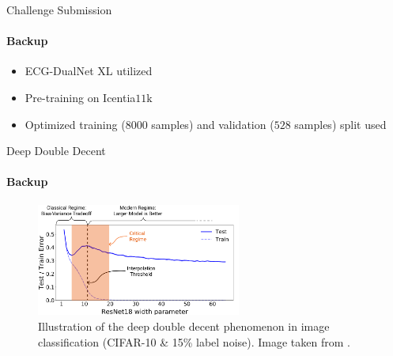 \begin{frame}{Challenge Submission}
\framesubtitle{Backup}
    \begin{itemize}
        \item ECG-DualNet XL utilized
        \item Pre-training on Icentia$11\si{\kilo}$
        \item Optimized training ($8000$ samples) and validation ($528$ samples) split used
    \end{itemize}
    \begin{table}[!ht]
        \centering
        \caption{Classification results of ECG-DualNet XL pre-trained on the Icentia$11$k dataset and fine-tuned on the PhysioNet dataset with optimized submission split. Metric computed on the small validation set.}
        
        \label{tab:results_challenge}
    \end{table}
\end{frame}

\begin{frame}{Deep Double Decent}
\framesubtitle{Backup}
    \begin{figure}[!ht]
        \centering
        \vspace{-0.2cm}
        \includegraphics[width=0.6\textwidth]{artwork/deep_double_decent.png}
        \vspace{-0.2cm}
        \caption{Illustration of the deep double decent phenomenon in image classification (CIFAR-10 \& 15\% label noise). Image taken from \cite{Nakkiran2020}.}
        \label{fig:ddd}
    \end{figure}
\end{frame}